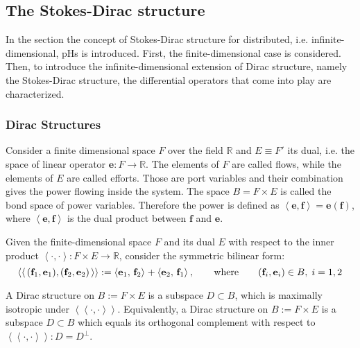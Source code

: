  
\subsection{The Stokes-Dirac structure}

In the section the concept of Stokes-Dirac structure for distributed, i.e. infinite-dimensional, pHs is introduced. First, the finite-dimensional case is considered. Then, to introduce the infinite-dimensional extension of Dirac structure, namely the Stokes-Dirac structure, the differential operators that come into play are characterized. 

\subsubsection{Dirac Structures}
Consider a  finite dimensional space ${F}$ over the field $\mathbb{R}$ and ${E} \equiv {F}'$ its dual, i.e. the space of linear operator $\mathbf{e} : {F} \rightarrow \mathbb{R}$. The elements of $\mathit{F}$ are called flows, while the elements of ${E}$ are called efforts. Those are port variables and their combination gives the power flowing inside the system. The space ${B} = {F} \times {E}$ is called the bond space of power variables. Therefore the power is defined as  $\left\langle \mathbf{e}, \mathbf{f} \right\rangle = \bm{e}(\mathbf{f})$, where $\left\langle \mathbf{e} , \mathbf{f} \right\rangle$ is the dual product between $\mathbf{f}$ and $\mathbf{e}$.
\begin{definition}
	Given the finite-dimensional space ${F}$ and its dual ${E}$ with respect to the inner product $\left\langle \cdot , \cdot \right\rangle : {F} \times {E} \rightarrow \mathbb{R}$, consider the symmetric bilinear form:
	\begin{equation}
	\left\langle \left\langle \, (\mathbf{f}_1, \mathbf{e}_1), (\mathbf{f}_2, \mathbf{e}_2) \, \right\rangle \right\rangle := \left\langle \mathbf{e}_1, \, \mathbf{f}_2 \right\rangle_{} +  \left\langle \mathbf{e}_2, \, \mathbf{f}_1 \right\rangle_{}, \qquad \text{where} \qquad (\mathbf{f}_i, \mathbf{e}_i) \in {B}, \; i = 1, 2
	\end{equation}
	
	A Dirac structure on ${B} := {F} \times {E}$ is a subspace ${D} \subset {B}$, which is maximally isotropic under $\left\langle \left\langle \cdot, \cdot \right\rangle \right\rangle$.	Equivalently, a Dirac structure on ${B} := {F} \times {E}$ is a subspace ${D} \subset {B}$ 	which equals its orthogonal complement with respect to $\left\langle \left\langle \cdot, \cdot \right\rangle \right\rangle: {D} ={D}^\perp$.
\end{definition}
